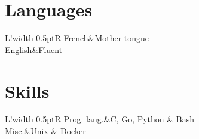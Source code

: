 \documentclass[10pt]{article}
\newcommand\VRule{\color{lightgray}\vrule width 0.5pt}
\begin{document}
\section*{Languages}
\begin{tabular}{L!{\VRule}R}
French&Mother tongue\\[3pt]
English&Fluent\\
\end{tabular}

\section*{Skills}
\begin{tabular}{L!{\VRule}R}
Prog. lang.&C, Go, Python \& Bash\\
Misc.&Unix \& Docker
\end{tabular}
\end{document}
